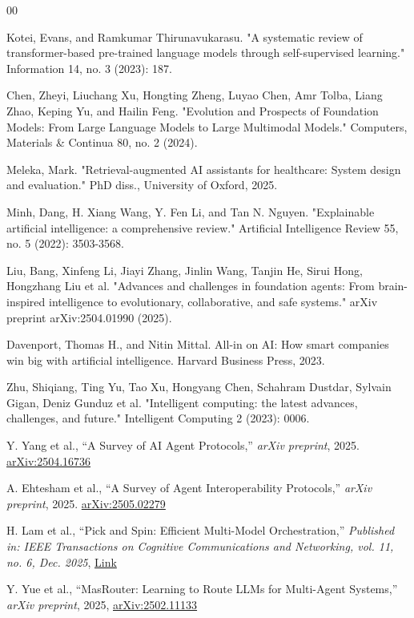 \documentclass[final,5p,times,twocolumn,authoryear,draft]{elsarticle}
\begin{document}
\begin{thebibliography}{00}

 Kotei, Evans, and Ramkumar Thirunavukarasu. "A systematic review of transformer-based pre-trained language models through self-supervised learning." Information 14, no. 3 (2023): 187.

 Chen, Zheyi, Liuchang Xu, Hongting Zheng, Luyao Chen, Amr Tolba, Liang Zhao, Keping Yu, and Hailin Feng. "Evolution and Prospects of Foundation Models: From Large Language Models to Large Multimodal Models." Computers, Materials \& Continua 80, no. 2 (2024).

 Meleka, Mark. "Retrieval-augmented AI assistants for healthcare: System design and evaluation." PhD diss., University of Oxford, 2025.

  Minh, Dang, H. Xiang Wang, Y. Fen Li, and Tan N. Nguyen. "Explainable artificial intelligence: a comprehensive review." Artificial Intelligence Review 55, no. 5 (2022): 3503-3568.

 Liu, Bang, Xinfeng Li, Jiayi Zhang, Jinlin Wang, Tanjin He, Sirui Hong, Hongzhang Liu et al. "Advances and challenges in foundation agents: From brain-inspired intelligence to evolutionary, collaborative, and safe systems." arXiv preprint arXiv:2504.01990 (2025).

 Davenport, Thomas H., and Nitin Mittal. All-in on AI: How smart companies win big with artificial intelligence. Harvard Business Press, 2023.

 Zhu, Shiqiang, Ting Yu, Tao Xu, Hongyang Chen, Schahram Dustdar, Sylvain Gigan, Deniz Gunduz et al. "Intelligent computing: the latest advances, challenges, and future." Intelligent Computing 2 (2023): 0006.

 Y. Yang et al., ``A Survey of AI Agent Protocols,'' 
\textit{arXiv preprint}, 2025. 
\href{https://arxiv.org/abs/2504.16736}{arXiv:2504.16736}

 A. Ehtesham et al., ``A Survey of Agent Interoperability Protocols,'' 
\textit{arXiv preprint}, 2025. 
\href{https://arxiv.org/abs/2505.02279}{arXiv:2505.02279}

 H. Lam et al., ``Pick and Spin: Efficient Multi-Model Orchestration,'' 
\textit{Published in: IEEE Transactions on Cognitive Communications and Networking, vol. 11, no. 6, Dec. 2025}, 
\href{https://doi.org/10.1109/TCCN.2025.1234567}{Link}

 Y. Yue et al., ``MasRouter: Learning to Route LLMs for Multi-Agent Systems,'' 
\textit{arXiv preprint}, 2025, 
\href{https://arxiv.org/abs/2502.11133}{arXiv:2502.11133}


\end{thebibliography}
\end{document}
